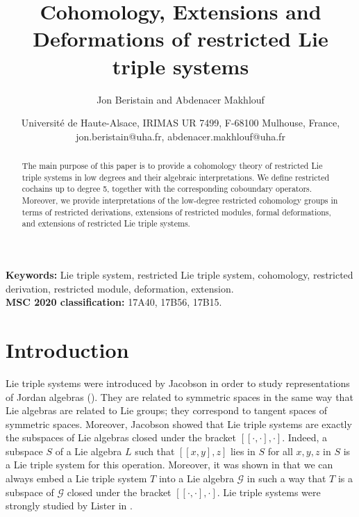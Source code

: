 \documentclass[11pt, twoside]{article}
\title{Cohomology, Extensions and Deformations of restricted Lie triple systems}
\author{Jon Beristain and Abdenacer Makhlouf}
\date{{\small{Universit\'e de Haute-Alsace, IRIMAS UR 7499, F-68100 Mulhouse, France,\\
jon.beristain@uha.fr, abdenacer.makhlouf@uha.fr}}}
\begin{document}
	
	\newtheorem{thm}{Theorem}[section]
	\newtheorem{prop}[thm]{Proposition}
	\newtheorem{lem}[thm]{Lemma}
	\newtheorem{cor}[thm]{Corollary}
	\theoremstyle{definition}
	\newtheorem{defi}[thm]{Definition}
	\newtheorem*{rmq}{Remark}
	\newtheorem{ex}[thm]{Example}
	\maketitle
	\begin{abstract}
		The main purpose of this paper is to provide a cohomology theory of restricted Lie triple systems in low degrees and their algebraic interpretations. 
        We define restricted cochains up to degree
5, together with the corresponding coboundary operators. Moreover, we provide 
interpretations of the low-degree restricted cohomology groups in terms of restricted derivations,
extensions of restricted modules, formal deformations, and extensions of restricted Lie triple systems.
	\end{abstract}
	
	\noindent\textbf{Keywords: }Lie triple system, restricted Lie triple system, cohomology, restricted derivation, restricted module, deformation, extension. \\
	\noindent\textbf{MSC 2020 classification:} 17A40, 17B56, 17B15.
	\tableofcontents


    
\section{Introduction}
Lie triple systems were introduced by Jacobson in order to study representations of Jordan algebras (\cite{J51}). They are related to symmetric spaces in the same way that Lie algebras are related to Lie groups; they correspond to tangent spaces of symmetric spaces. Moreover, Jacobson showed that Lie triple systems are exactly the subspaces of Lie algebras closed under the bracket  $[[\cdot,\cdot],\cdot] $. Indeed, a subspace $S$ of a Lie algebra $L$ such that $[[x,y],z] $ lies in $S$ for all $x,y,z$ in $S$ is a Lie triple system for this operation. Moreover, it was shown in \cite{J51} that we can always embed a Lie triple system $T$ into a Lie algebra $\mathcal{G} $ in such a way that $T$ is a subspace of $\mathcal{G} $ closed under the bracket $[[\cdot,\cdot],\cdot] $. Lie triple systems were strongly studied by Lister in \cite{L51}.
\end{document}
